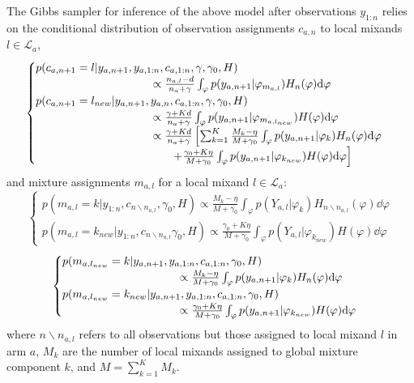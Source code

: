 The Gibbs sampler for inference of the above model after observations $y_{1:n}$ relies on the conditional distribution of observation assignments $c_{a,n}$ to local mixands $l \in \mathcal{L}_a$, 
\begin{equation}
\begin{cases}
p(c_{a,n+1}=l|y_{a,n+1},y_{a,1:n},c_{a,1:n}, \gamma, \gamma_0,H) \\
\hspace*{0.3\columnwidth}  \propto \frac{n_{a,l}-d}{n_a+\gamma} \int_{\varphi} p(y_{a,n+1}|\varphi_{m_{a,l}}) H_{n}(\varphi) \dd{\varphi}\\
p(c_{a,n+1}=l_{new}|y_{a,n+1},y_{a,n},c_{a,1:n},\gamma, \gamma_0, H) \\
\hspace*{0.3\columnwidth} \propto \frac{\gamma+Kd}{n_a+\gamma} \int_{\varphi} p(y_{a,n+1}|\varphi_{m_{a,l_{new}}}) H(\varphi) \dd{\varphi}\\
\hspace*{0.3\columnwidth} \propto \frac{\gamma+Kd}{n_a+\gamma} \left[ \sum_{k=1}^{K} \frac{M_{k}-\eta}{M+\gamma_0}\int_{\varphi} p(y_{a,n+1}|\varphi_{k}) H_{n}(\varphi) \dd{\varphi} \right. \\
\hspace*{0.35\columnwidth}\left. + \frac{\gamma_0 +K\eta}{M+\gamma_0} \int_{\varphi} p(y_{a,n+1}|\varphi_{k_{new}}) H(\varphi) \dd{\varphi} \right]\\
\end{cases}
\end{equation}
and mixture assignments $m_{a,l}$ for a local mixand $l\in \mathcal{L}_a$:
\begin{equation}
\begin{cases}
p(m_{a,l}=k|y_{1:n},c_{n \backslash n_{a,l}}, \gamma_0, H) \propto \frac{M_{k}-\eta}{M+\gamma_0} \int_{\varphi} p(Y_{a,l}|\varphi_{k}) H_{n \backslash n_{a,l}}(\varphi) \dd{\varphi}\\
p(m_{a,l}=k_{new}|y_{1:n},c_{n \backslash n_{a,l}}\gamma_0, H) \propto \frac{\gamma_0+K\eta}{M+\gamma_0} \int_{\varphi} p(Y_{a,l}|\varphi_{k_{new}}) H(\varphi) \dd{\varphi}
\end{cases}
\end{equation}
\begin{equation}
\begin{cases}
p(m_{a,l_{new}}=k|y_{a,n+1},y_{a,1:n},c_{a,1:n}, \gamma_0, H) \\
\hspace*{0.3\columnwidth} \propto \frac{M_{k}-\eta}{M+\gamma_0} \int_{\varphi} p(y_{a,n+1}|\varphi_{k}) H_{n}(\varphi) \dd{\varphi}\\
p(m_{a,l_{new}}=k_{new}|y_{a,n+1},y_{a,1:n},c_{a,1:n},\gamma_0, H) \\
\hspace*{0.3\columnwidth} \propto \frac{\gamma_0+K\eta}{M+\gamma_0} \int_{\varphi} p(y_{a,n+1}|\varphi_{k_{new}}) H(\varphi) \dd{\varphi}\\
\end{cases}
\end{equation}
where $n \backslash n_{a,l}$ refers to all observations but those assigned to local mixand $l$ in arm $a$, $M_k$ are the number of local mixands assigned to global mixture component $k$, and $M=\sum_{k=1}^K M_k$.

